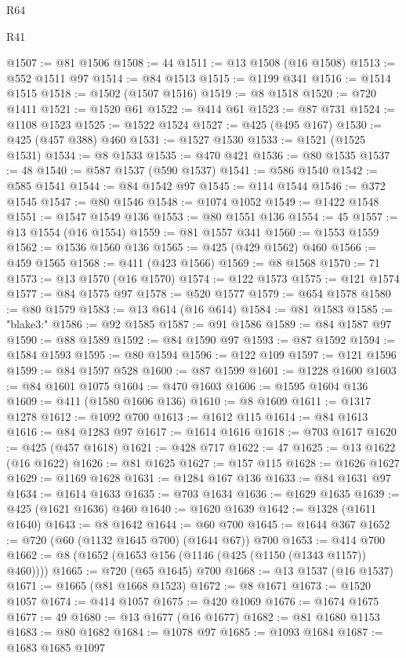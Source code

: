 \begin{lexlean}{R64}
\begin{lexlean}{R41}
\begin{coremodule}
{{{{{{{{{{{{{{{{{{{{{{{{{{{{{{{{{{{{{{{{{{{{{{{{{{{{{{{{{{{{{{{{{{{{{{{{{{{{{{{{{{{{{{{{{@1507 := @81 @1506
@1508 := 44
@1511 := @13 @1508 (@16 @1508)
@1513 := @552 @1511 @97
@1514 := @84 @1513
@1515 := @1199 @341
@1516 := @1514 @1515
@1518 := @1502 (@1507 @1516)
@1519 := @8 @1518
@1520 := @720 @1411
@1521 := @1520 @61
@1522 := @414 @61
@1523 := @87 @731
@1524 := @1108 @1523
@1525 := @1522 @1524
@1527 := @425 (@495 @167)
@1530 := @425 (@457 @388) @460
@1531 := @1527 @1530
@1533 := @1521 (@1525 @1531)
@1534 := @8 @1533
@1535 := @470 @421
@1536 := @80 @1535
@1537 := 48
@1540 := @587 @1537 (@590 @1537)
@1541 := @586 @1540
@1542 := @585 @1541
@1544 := @84 @1542 @97
@1545 := @114 @1544
@1546 := @372 @1545
@1547 := @80 @1546
@1548 := @1074 @1052
@1549 := @1422 @1548
@1551 := @1547 @1549 @136
@1553 := @80 @1551 @136
@1554 := 45
@1557 := @13 @1554 (@16 @1554)
@1559 := @81 @1557 @341
@1560 := @1553 @1559
@1562 := @1536 @1560 @136
@1565 := @425 (@429 @1562) @460
@1566 := @459 @1565
@1568 := @411 (@423 @1566)
@1569 := @8 @1568
@1570 := 71
@1573 := @13 @1570 (@16 @1570)
@1574 := @122 @1573
@1575 := @121 @1574
@1577 := @84 @1575 @97
@1578 := @520 @1577
@1579 := @654 @1578
@1580 := @80 @1579
@1583 := @13 @614 (@16 @614)
@1584 := @81 @1583
@1585 := "blake3:"
@1586 := @92 @1585
@1587 := @91 @1586
@1589 := @84 @1587 @97
@1590 := @88 @1589
@1592 := @84 @1590 @97
@1593 := @87 @1592
@1594 := @1584 @1593
@1595 := @80 @1594
@1596 := @122 @109
@1597 := @121 @1596
@1599 := @84 @1597 @528
@1600 := @87 @1599
@1601 := @1228 @1600
@1603 := @84 @1601 @1075
@1604 := @470 @1603
@1606 := @1595 @1604 @136
@1609 := @411 (@1580 @1606 @136)
@1610 := @8 @1609
@1611 := @1317 @1278
@1612 := @1092 @700
@1613 := @1612 @115
@1614 := @84 @1613
@1616 := @84 @1283 @97
@1617 := @1614 @1616
@1618 := @703 @1617
@1620 := @425 (@457 @1618)
@1621 := @428 @717
@1622 := 47
@1625 := @13 @1622 (@16 @1622)
@1626 := @81 @1625
@1627 := @157 @115
@1628 := @1626 @1627
@1629 := @1169 @1628
@1631 := @1284 @167 @136
@1633 := @84 @1631 @97
@1634 := @1614 @1633
@1635 := @703 @1634
@1636 := @1629 @1635
@1639 := @425 (@1621 @1636) @460
@1640 := @1620 @1639
@1642 := @1328 (@1611 @1640)
@1643 := @8 @1642
@1644 := @60 @700
@1645 := @1644 @367
@1652 := @720 (@60 (@1132 @1645 @700) (@1644 @67)) @700
@1653 := @414 @700
@1662 := @8 (@1652 (@1653 @156 (@1146 (@425 (@1150 (@1343 @1157)) @460))))
@1665 := @720 (@65 @1645) @700
@1668 := @13 @1537 (@16 @1537)
@1671 := @1665 (@81 @1668 @1523)
@1672 := @8 @1671
@1673 := @1520 @1057
@1674 := @414 @1057
@1675 := @420 @1069
@1676 := @1674 @1675
@1677 := 49
@1680 := @13 @1677 (@16 @1677)
@1682 := @81 @1680 @1153
@1683 := @80 @1682
@1684 := @1078 @97
@1685 := @1093 @1684
@1687 := @1683 @1685 @1097
}}}}}}}}}}}}}}}}}}}}}}}}}}}}}}}}}}}}}}}}}}}}}}}}}}}}}}}}}}}}}}}}}}}}}}}}}}}}}}}}}}}}}}}}}
\end{coremodule}
\end{lexlean}
\end{lexlean}

